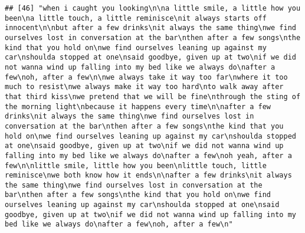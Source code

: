 \documentclass[]{article}
\begin{document}
\begin{verbatim}
## [46] "when i caught you looking\n\na little smile, a little how you been\na little touch, a little reminisce\nit always starts off innocent\n\nbut after a few drinks\nit always the same thing\nwe find ourselves lost in conversation at the bar\nthen after a few songs\nthe kind that you hold on\nwe find ourselves leaning up against my car\nshoulda stopped at one\nsaid goodbye, given up at two\nif we did not wanna wind up falling into my bed like we always do\nafter a few\noh, after a few\n\nwe always take it way too far\nwhere it too much to resist\nwe always make it way too hard\nto walk away after that third kiss\nwe pretend that we will be fine\nthrough the sting of the morning light\nbecause it happens every time\n\nafter a few drinks\nit always the same thing\nwe find ourselves lost in conversation at the bar\nthen after a few songs\nthe kind that you hold on\nwe find ourselves leaning up against my car\nshoulda stopped at one\nsaid goodbye, given up at two\nif we did not wanna wind up falling into my bed like we always do\nafter a few\noh yeah, after a few\n\nlittle smile, little how you been\nlittle touch, little reminisce\nwe both know how it ends\n\nafter a few drinks\nit always the same thing\nwe find ourselves lost in conversation at the bar\nthen after a few songs\nthe kind that you hold on\nwe find ourselves leaning up against my car\nshoulda stopped at one\nsaid goodbye, given up at two\nif we did not wanna wind up falling into my bed like we always do\nafter a few\noh, after a few\n"                                                                                                                                                                                                                                                                                                                                                                                                                                                                                                                                                                                                                                                                                                                                                                                                                                                                                                                                                                                                                                                                                                                                                                                                                                                                                                                                                                                                       

\end{verbatim}
\end{document}
